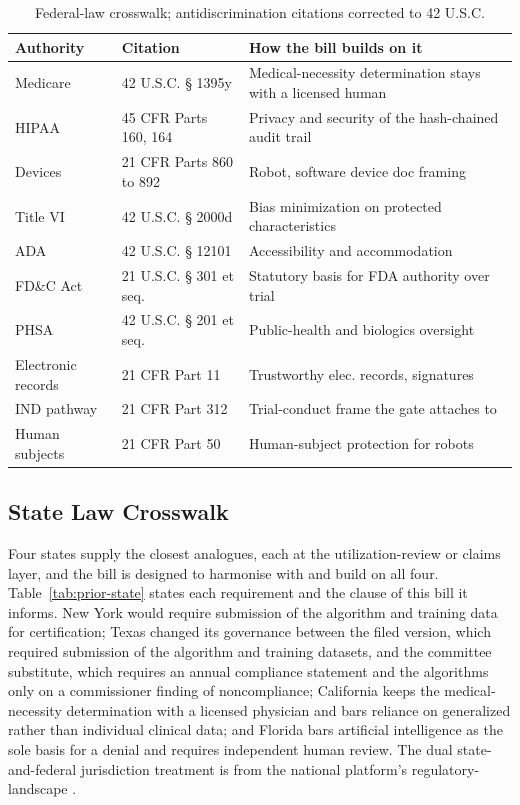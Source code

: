 \begin{table}[ht]
\centering
\begin{tabularx}{\textwidth}{L{3.8cm} L{4cm} Y}
\toprule
\textbf{Authority} & \textbf{Citation} & \textbf{How the bill builds on it} \\
\midrule
Medicare \cite{usc-1395y} & 42 U.S.C. § 1395y & Medical-necessity determination stays with a licensed human \\
HIPAA \cite{cfr-hipaa} & 45 CFR Parts 160, 164 & Privacy and security of the hash-chained audit trail \\
Devices \cite{cfr-devices} & 21 CFR Parts 860 to 892 & Robot, software device doc framing \\
Title VI \cite{usc-titlevi} & 42 U.S.C. § 2000d & Bias minimization on protected characteristics \\
ADA \cite{usc-ada} & 42 U.S.C. § 12101 & Accessibility and accommodation \\
FD\&C Act \cite{usc-fdca} & 21 U.S.C. § 301 et seq. & Statutory basis for FDA authority over trial \\
PHSA \cite{usc-phsa} & 42 U.S.C. § 201 et seq. & Public-health and biologics oversight \\
Electronic records \cite{cfr-part11} & 21 CFR Part 11 & Trustworthy elec. records, signatures \\
IND pathway \cite{cfr-part312} & 21 CFR Part 312 & Trial-conduct frame the gate attaches to \\
Human subjects \cite{cfr-part50} & 21 CFR Part 50 & Human-subject protection for robots \\
\bottomrule
\end{tabularx}
\caption{Federal-law crosswalk; antidiscrimination citations corrected to 42 U.S.C.}
\label{tab:prior-federal}
\end{table}

\clearpage

\subsection{State Law Crosswalk}

Four states supply the closest analogues, each at the utilization-review or
claims layer, and the bill is designed to harmonise with and build on all four.
Table~\ref{tab:prior-state} states each requirement and the clause of this bill it
informs. New York would require submission of the algorithm and training data for
certification; Texas changed its governance between the filed version, which
required submission of the algorithm and training datasets, and the committee
substitute, which requires an annual compliance statement and the algorithms only
on a commissioner finding of noncompliance; California keeps the medical-necessity
determination with a licensed physician and bars reliance on generalized rather
than individual clinical data; and Florida bars artificial intelligence as the
sole basis for a denial and requires independent human review. The dual
state-and-federal jurisdiction treatment is from the national platform's
regulatory-landscape \cite{kawchak2026national}.

